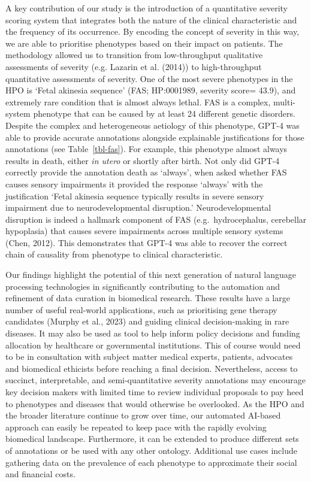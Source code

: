 \documentclass[
]{agujournal2019}
\begin{document}
A key contribution of our study is the introduction of a quantitative
severity scoring system that integrates both the nature of the clinical
characteristic and the frequency of its occurrence. By encoding the
concept of severity in this way, we are able to prioritise phenotypes
based on their impact on patients. The methodology allowed us to
transition from low-throughput qualitative assessments of severity (e.g.
Lazarin et al. (2014)) to high-throughput quantitative assessments of
severity. One of the most severe phenotypes in the HPO is `Fetal
akinesia sequence' (FAS; HP:0001989, severity score= 43.9), and
extremely rare condition that is almost always lethal. FAS is a complex,
multi-system phenotype that can be caused by at least 24 different
genetic disorders. Despite the complex and heterogeneous aetiology of
this phenotype, GPT-4 was able to provide accurate annotations alongside
explainable justifications for those annotations (see
Table~\ref{tbl-fas}). For example, this phenotype almost always results
in death, either \emph{in utero} or shortly after birth. Not only did
GPT-4 correctly provide the annotation death as `always', when asked
whether FAS causes sensory impairments it provided the response `always'
with the justification `Fetal akinesia sequence typically results in
severe sensory impairment due to neurodevelopmental disruption.'
Neurodevelopmental disruption is indeed a hallmark component of FAS
(e.g.~hydrocephalus, cerebellar hypoplasia) that causes severe
impairments across multiple sensory systems (Chen, 2012). This
demonstrates that GPT-4 was able to recover the correct chain of
causality from phenotype to clinical characteristic.

Our findings highlight the potential of this next generation of natural
language processing technologies in significantly contributing to the
automation and refinement of data curation in biomedical research. These
results have a large number of useful real-world applications, such as
prioritising gene therapy candidates (Murphy et al., 2023) and guiding
clinical decision-making in rare diseases. It may also be used as tool
to help inform policy decisions and funding allocation by healthcare or
governmental institutions. This of course would need to be in
consultation with subject matter medical experts, patients, advocates
and biomedical ethicists before reaching a final decision. Nevertheless,
access to succinct, interpretable, and semi-quantitative severity
annotations may encourage key decision makers with limited time to
review individual proposals to pay heed to phenotypes and diseases that
would otherwise be overlooked. As the HPO and the broader literature
continue to grow over time, our automated AI-based approach can easily
be repeated to keep pace with the rapidly evolving biomedical landscape.
Furthermore, it can be extended to produce different sets of annotations
or be used with any other ontology. Additional use cases include
gathering data on the prevalence of each phenotype to approximate their
social and financial costs.
\end{document}
